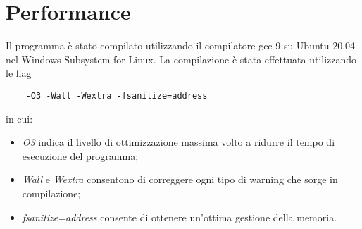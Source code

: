 \documentclass[../main.tex]{subfiles}
\begin{document}
\section{Performance}
Il programma \`e stato compilato utilizzando il compilatore gcc-9 su Ubuntu 20.04 nel Windows Subsystem for Linux.
La compilazione \`e stata effettuata utilizzando le flag
\begin{verbatim}
    -O3 -Wall -Wextra -fsanitize=address
\end{verbatim}
in cui:
\begin{itemize}
    \item \emph{O3} indica il livello di ottimizzazione massima volto a ridurre il tempo di esecuzione del programma;
    \item \emph{Wall} e \emph{Wextra} consentono di correggere ogni tipo di warning che sorge in compilazione;
    \item \emph{fsanitize=address} consente di ottenere un'ottima gestione della memoria.
\end{itemize}
\end{document}

